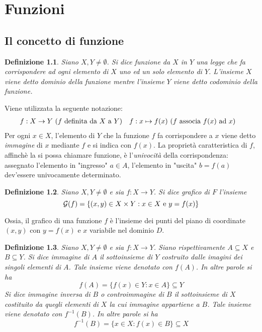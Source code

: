 \documentclass[11pt]{book}
\newtheorem*{definition}{Definizione}
\begin{document}
\chapter{Funzioni}
\section{Il concetto di funzione}
\begin{definition}
    Siano $X,Y\neq\emptyset$. Si dice funzione da $X$ in $Y$ una legge che fa corrispondere ad ogni elemento di $X$ uno 
    ed un solo elemento di $Y$. L'insieme $X$ viene detto dominio della funzione mentre l'insieme $Y$ viene detto codominio 
    della funzione.
\end{definition}
Viene utilizzata la seguente notazione:
\begin{align*}
    f&:X\rightarrow Y \textnormal{ ($f$ definita da $X$ a $Y$)} & f:x&\mapsto f(x) \textnormal{ ($f$ associa $f(x)$ ad $x$)}
\end{align*}
Per ogni $x\in X$, l'elemento di $Y$ che la funzione $f$ fa corrispondere a $x$ viene detto \textit{immagine} di $x$ 
mediante $f$ e si indica con $f(x)$. La proprietà caratteristica di $f$, affinchè la si possa chiamare funzione, è 
l'\textit{univocità} della corrispondenza: assegnato l'elemento in "ingresso" $a\in A$, l'elemento in "uscita" $b=f(a)$ 
dev'essere univocamente determinato.
\begin{definition}
    Siano $X,Y \neq \emptyset$ e sia $f:X\rightarrow Y$. Si dice grafico di $F$ l'insieme
    \begin{equation*}
        \mathcal{G}(f)=\{(x,y)\in X\times Y:x\in X \textnormal{ e } y=f(x)\}
    \end{equation*}
\end{definition}
Ossia, il grafico di una funzione $f$ è l'insieme dei punti del piano di coordinate $(x,y)$ con $y=f(x)$ e $x$ variabile 
nel dominio $D$.
\begin{definition}
    Siano $X,Y \neq \emptyset$ e sia $f:X\rightarrow Y$. Siano rispettivamente $A\subseteq X$ e $B\subseteq Y$. Si dice 
    immagine di $A$ il sottoinsieme di $Y$ costruito dalle imagini dei singoli elementi di $A$. Tale insieme viene denotato 
    con $f(A)$. In altre parole si ha 
    \begin{equation*}
        f(A)=\{f(x)\in Y:x\in A\}\subseteq Y 
    \end{equation*}
    Si dice immagine inversa di $B$ o controimmagine di $B$ il sottoinsieme di $X$ costituito da quegli elementi di $X$ 
    la cui immagine appartiene a $B$. Tale insieme viene denotato con $f^{-1}(B)$. In altre parole si ha 
    \begin{equation*}
        f^{-1}(B)=\{x\in X:f(x)\in B\}\subseteq X
    \end{equation*}
\end{definition}
\end{document}
